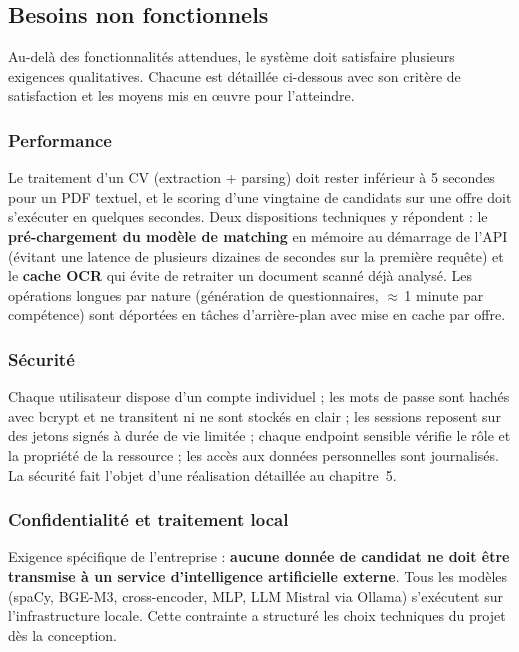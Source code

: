 \documentclass[12pt,a4paper]{report}
\begin{document}
\subsection{Besoins non fonctionnels}

Au-delà des fonctionnalités attendues, le système doit satisfaire plusieurs exigences qualitatives. Chacune est détaillée ci-dessous avec son critère de satisfaction et les moyens mis en \oe uvre pour l'atteindre.

\subsubsection{Performance}

Le traitement d'un CV (extraction + parsing) doit rester inférieur à 5 secondes pour un PDF textuel, et le scoring d'une vingtaine de candidats sur une offre doit s'exécuter en quelques secondes. Deux dispositions techniques y répondent : le \textbf{pré-chargement du modèle de matching} en mémoire au démarrage de l'API (évitant une latence de plusieurs dizaines de secondes sur la première requête) et le \textbf{cache OCR} qui évite de retraiter un document scanné déjà analysé. Les opérations longues par nature (génération de questionnaires, $\approx$\,1 minute par compétence) sont déportées en tâches d'arrière-plan avec mise en cache par offre.

\subsubsection{Sécurité}

Chaque utilisateur dispose d'un compte individuel ; les mots de passe sont hachés avec bcrypt et ne transitent ni ne sont stockés en clair ; les sessions reposent sur des jetons signés à durée de vie limitée ; chaque endpoint sensible vérifie le rôle et la propriété de la ressource ; les accès aux données personnelles sont journalisés. La sécurité fait l'objet d'une réalisation détaillée au chapitre~5.

\subsubsection{Confidentialité et traitement local}

Exigence spécifique de l'entreprise : \textbf{aucune donnée de candidat ne doit être transmise à un service d'intelligence artificielle externe}. Tous les modèles (spaCy, BGE-M3, cross-encoder, MLP, LLM Mistral via Ollama) s'exécutent sur l'infrastructure locale. Cette contrainte a structuré les choix techniques du projet dès la conception.
\end{document}
